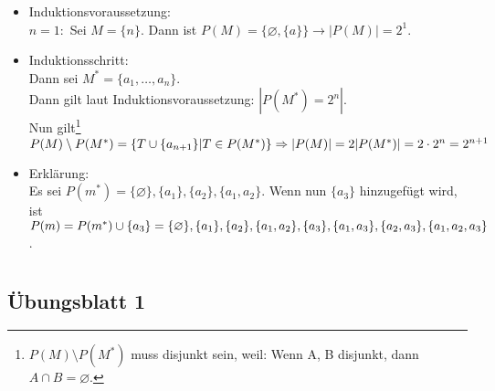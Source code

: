 \documentclass[12pt,a4paper]{report}
\begin{document}
\begin{enumerate}
		\begin{itemize}
			\item Induktionsvoraussetzung:\\
			$ n=1: $ Sei $M=\{n\}$. Dann ist $P(M)=\{\varnothing,\{a\}\} \rightarrow |P(M)|=2^1$.
			\item Induktionsschritt:\\
			Dann sei $M^*=\{a_1,\dots, a_n\}$.\\
			Dann gilt laut Induktionsvoraussetzung: $|P(M^*)=2^n|$.
			\\Nun gilt\footnote{$P(M) \setminus P(M^*)$ muss disjunkt sein, weil: Wenn A, B disjunkt, dann $ A \cap B = \varnothing$.} $P(M) \setminus P(M^*) = \{T \cup \{a_{n+1}\} | T \in P(M^*)\} \\
			\Rightarrow |P(M)|=2|P(M^*)|=2\cdot 2^n= 2^{n+1}$
			\item Erklärung:\\
			Es sei $ P(m^*) = \{\varnothing\}, \{a_1\}, \{a_2\}, \{a_1,a_2\}$. Wenn nun $ \{a_3\} $ hinzugefügt wird, ist $ P(m) = P(m^*) \cup \{a_{3}\} = \{\varnothing\}, \{a_1\}, \{a_2\}, \{a_1,a_2\},\\
			\{a_3\}, \{a_1,a_3\}, \{a_2,a_3\}, \{a_1,a_2,a_3\} $.
		\end{itemize}
	\end{enumerate}

\appendices
	\chapter{}
	\section{Übungsblatt 1}\label{uebungsblatt1}
	
\end{document}
